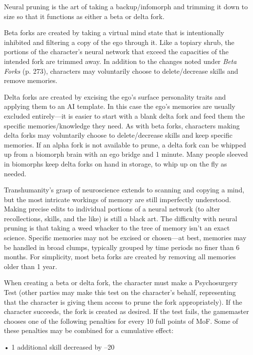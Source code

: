 Neural pruning is the art of taking a backup/infomorph
and trimming it down to size so that it functions
as either a beta or delta fork.

Beta forks are created by taking a virtual mind state 
that is intentionally inhibited and filtering a copy of 
the ego through it. Like a topiary shrub, the portions 
of the character's neural network that exceed the capacities
of the intended fork are trimmed away. In addition
to the changes noted under \textit{Beta Forks} (p. 273),
characters may voluntarily choose to delete/decrease 
skills and remove memories.

Delta forks are created by excising the ego's surface 
personality traits and applying them to an AI template. 
In this case the ego's memories are usually excluded 
entirely—it is easier to start with a blank delta fork 
and feed them the specific memories/knowledge they 
need. As with beta forks, characters making delta forks 
may voluntarily choose to delete/decrease skills and 
keep specific memories. If an alpha fork is not available
to prune, a delta fork can be whipped up from
a biomorph brain with an ego bridge and 1 minute. 
Many people sleeved in biomorphs keep delta forks on 
hand in storage, to whip up on the fly as needed.

Transhumanity's grasp of neuroscience extends to 
scanning and copying a mind, but the most intricate 
workings of memory are still imperfectly understood. 
Making precise edits to individual portions of a neural 
network (to alter recollections, skills, and the like) is 
still a black art. The difficulty with neural pruning is 
that taking a weed whacker to the tree of memory 
isn't an exact science. Specific memories may not be 
excised or chosen—at best, memories may be handled 
in broad clumps, typically grouped by time periods no 
finer than 6 months. For simplicity, most beta forks are 
created by removing all memories older than 1 year.

When creating a beta or delta fork, the character 
must make a Psychosurgery Test (other parties may 
make this test on the character's behalf, representing 
that the character is giving them access to prune the 
fork appropriately). If the character succeeds, the fork 
is created as desired. If the test fails, the gamemaster 
chooses one of the following penalties for every 10 
full points of MoF. Some of these penalties may be 
combined for a cumulative effect:

•  1 additional skill decreased by –20

